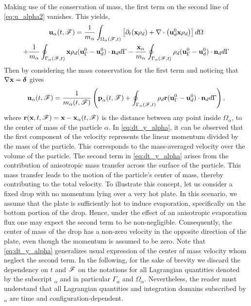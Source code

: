 Making use of the conservation of mass, the first term on the second line of \ref{eq:u_alpha2} vanishes. This yields,%
\begin{multline}
    \textbf{u}_\alpha(t,\mathscr{F}) = 
    \frac{1}{m_\alpha}\int_{\Omega_{\alpha}(\mathscr{F},t)}  \left[
        \partial_t (\textbf{x}\rho_d ) + \mathbf{\nabla}\cdot\left(\textbf{u}_d^0 \textbf{x} \rho_d\right) 
    \right] d\Omega \\
    + \frac{1}{m_\alpha}\oint_{\Gamma_{\alpha}(\mathscr{F},t)}  \textbf{x} \rho_d(\textbf{u}_\Gamma^0   - \textbf{u}_d^0) \cdot \textbf{n}_d  d\Gamma
    -  \frac{\textbf{x}_\alpha}{m_\alpha}    \oint_{\Gamma_{\alpha}(\mathscr{F},t)}  \rho_d(\textbf{u}_\Gamma^0   - \textbf{u}_d^0) \cdot \textbf{n}_d  d\Gamma
\end{multline}
Then by considering the mass conservation for the first term and noticing that $\mathbf{\nabla} \textbf{x} = \bm\delta$ gives%
\begin{equation}
    \textbf{u}_\alpha(t,\FF) = \frac{1}{m_\alpha(t,\FF)} \left(
        \textbf{p}_\alpha(t,\FF)
        +  \intSF{\rho_d \textbf{r} (\textbf{u}_\Gamma^0 - \textbf{u}_d^0)\cdot \textbf{n}_d }
        \right),
        \label{eq:dt_y_alpha}
\end{equation}
where $\textbf{r}(\textbf{x},t,\mathscr{F}) = \textbf{x} - \textbf{x}_\alpha(t,\mathscr{F})$ is the distance between any point inside $\Omega_\alpha$, to the center of mass of the particle $\alpha$.
In \ref{eq:dt_y_alpha}, it can be observed that the first component of the velocity represents the linear momentum divided by the mass of the particle. 
This corresponds to the mass-averaged velocity over the volume of the particle.
The second term in \ref{eq:dt_y_alpha} arises from the contribution of anisotropic mass transfer across the surface of the particle. 
This mass transfer leads to the motion of the particle's center of mass, thereby contributing to the total velocity.
To illustrate this concept, let us consider a fixed drop with no momentum lying over a very hot plate.
In this scenario, we assume that the plate is sufficiently hot to induce evaporation, specifically on the bottom portion of the drop.
Hence, under the effect of an anisotropic evaporation flux one may expect the second term to be non-negligible.
Consequently, the center of mass of the drop has a non-zero velocity in the opposite direction of the plate, even though the momentum is assumed to be zero.
Note that \ref{eq:dt_y_alpha} generalizes usual expression of the center of mass velocity whom neglect the second term.
In the following, for the sake of brevity we discard the dependency on $t$ and $\mathscr{F}$ on the notations for all Lagrangian quantities denoted by the subscript $_\alpha$ and in particular $\Gamma_\alpha$ and $\Omega_\alpha$.
Nevertheless, the reader must understand that all Lagrangian quantities and integration domains subscribed by $_\alpha$ are time and configuration-dependent. 



